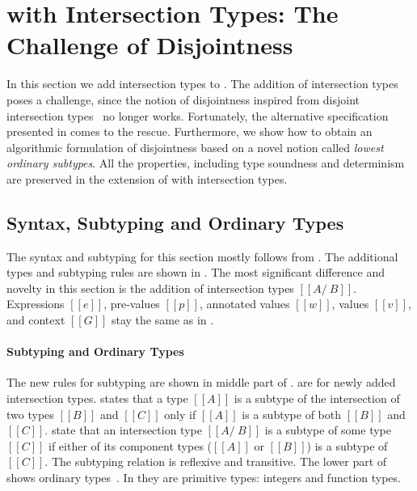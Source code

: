 \section{\cal with Intersection Types: The Challenge of Disjointness}
\label{sec:inter}

In this section we add intersection types to \cal.
The addition of intersection types poses a challenge,
since the notion of disjointness inspired from disjoint intersection types~\citep{oliveira2016disjoint}
no longer works. Fortunately, the alternative specification presented in
 comes to the rescue. Furthermore, we show how to obtain
an algorithmic formulation of disjointness based on a novel notion
called \emph{lowest ordinary subtypes}. All the properties, including
type soundness and determinism are preserved in the extension of \cal
with intersection types.

\subsection{Syntax, Subtyping and Ordinary Types}
\label{sec:inter:system}
The syntax and subtyping for this section mostly follows
from .  The additional types and subtyping rules are shown in
.
The most significant difference and novelty in this section
is the addition of intersection types $[[A/\ B]]$.
Expressions $[[e]]$, pre-values $[[p]]$, annotated values $[[w]]$,
values $[[v]]$, and context $[[G]]$ stay the same as in .

\paragraph{Subtyping and Ordinary Types}
The new rules for subtyping are shown in middle part of
.   are for newly
added intersection types.  states that a type $[[A]]$ is
a subtype of the intersection of two types $[[B]]$ and $[[C]]$ only if
$[[A]]$ is a subtype of both $[[B]]$ and $[[C]]$.  
state that an intersection type $[[A /\ B]]$ is a subtype
of some type $[[C]]$ if either of its component types ($[[A]]$ or
$[[B]]$) is a subtype of $[[C]]$. The subtyping relation is reflexive
and transitive. The lower part of
 shows ordinary types~\cite{davies2000intersection}.
In \cal they are primitive types: integers and function types. 

